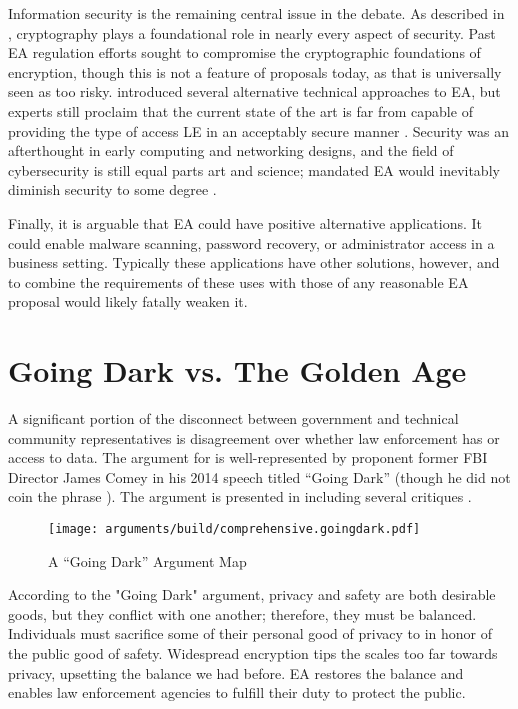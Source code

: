 Information security is the remaining central issue in the debate. As described in ,
\ac{cryptography} plays a foundational role in nearly every aspect of security. Past \ac{EA} regulation efforts sought
to compromise the cryptographic foundations of encryption, though this is not a feature of proposals today, as that is
universally seen as too risky.  introduced several alternative technical approaches to
\ac{EA}, but experts still proclaim that the current state of the art is far from capable of providing the type of
access \acl{LE} in an acceptably secure manner \cite{abelson_2015} \cite{abelson_risks_1997}. Security was an
afterthought in early computing and networking designs, and the field of cybersecurity is still equal parts art and
science; mandated \ac{EA} would inevitably diminish security to some degree \cite{abelson_2015}.

Finally, it is arguable that \ac{EA} could have positive alternative applications. It could enable malware scanning,
password recovery, or administrator access in a business setting. Typically these applications have other solutions,
however, and to combine the requirements of these uses with those of any reasonable \ac{EA} proposal would likely
fatally weaken it.


\section{Going Dark vs. The Golden Age}

A significant portion of the disconnect between government and technical community representatives is disagreement over
whether law enforcement has  or  access to data. The argument for  is
well-represented by proponent former \ac{FBI} Director James Comey in his 2014 speech titled ``Going Dark''
\cite{comey_2014} (though he did not coin the phrase \cite{swire_encryption_2011}). The argument is presented in
 including several critiques \cite{rogaway_moral_2015}.

\begin{figure}[t!]
  \centering\CaptionFontSize
  \texttt{[image: arguments/build/comprehensive.goingdark.pdf]}
  \caption{A ``Going Dark'' Argument Map}
  \label{fig-arg-going-dark}
\end{figure}

According to the "Going Dark" argument, privacy and safety are both desirable goods, but they conflict with one another;
therefore, they must be balanced. Individuals must sacrifice some of their personal good of privacy to in honor of the
public good of safety. Widespread encryption tips the scales too far towards privacy, upsetting the balance we had
before. \ac{EA} restores the balance and enables law enforcement agencies to fulfill their duty to protect the public.

